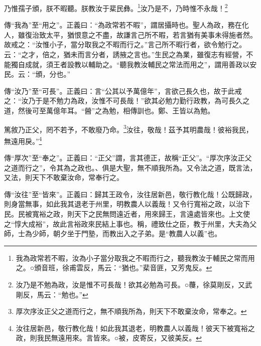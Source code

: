 乃惟孺子頒，朕不暇聽。朕教汝于棐民彝。\footnote{我為政常若不暇，汝為小子當分取我之不暇而行之，聽我教汝于輔民之常而用之。○頒音班，徐甫雲反，馬云：“猶也。”棐音匪，又芳鬼反。}汝乃是不，乃時惟不永哉！\footnote{汝乃是不勉為政，汝是惟不可長哉！欲其必勉為可長。○蘉，徐莫剛反，又武剛反，馬云：“勉也。”}

{\noindent\zhuan{}\fzbyks 傳“我為”至“用之”。正義曰：“為政常若不暇”，謂居攝時也。聖人為政，務在化人，雖復治致太平，猶恨意之不盡，故謙言己所不暇，若言猶有美事未得施者然。故戒之：“汝惟小子，當分取我之不暇而行之。”言己所不暇行者，欲令勉行之。云：“之才，倍之，猶未而言分者，誘掖之言也。”生民之為業，雖復志有經營，不能獨自成就，須王者設教以輔助之。“聽我教汝輔民之常法而用之”，謂用善政以安民。云：“頒，分也。” \par}

{\noindent\zhuan{}\fzbyks 傳“汝乃”至“可長”。正義曰：言“公其以予萬億年”，言欲己長久也，故于此戒之：“汝乃于是不勉力為政，汝惟不可長哉！”欲其必勉力勤行政教，為可長久之道，然後可至萬億年耳。“醟”之為勉，相傳訓也。鄭、王皆以為勉。 \par}

篤敘乃正父，罔不若予，不敢廢乃命。\footnote{厚次序汝正父之道而行之，無不順我所為，則天下不敢棄汝命，常奉之。}汝往，敬哉！茲予其明農哉！彼裕我民，無遠用戾。”\footnote{汝往居新邑，敬行教化哉！如此我其退老，明教農人以義哉！彼天下被寬裕之政，則我民無遠用來。言皆來。○被，皮寄反，又彼美反。}

{\noindent\zhuan{}\fzbyks 傳“厚次”至“奉之”。正義曰：“正父”謂，言其德正，故稱“正父”。“厚次序汝正父之道而行之”，令其為之政也。、俱是大聖，無不順我所為。又令法之道，既言法，又法，則天下不敢棄汝命，常奉行之。 \par}

{\noindent\zhuan{}\fzbyks 傳“汝往”至“皆來”。正義曰：歸其王政令，汝往居新邑，敬行教化哉！公既歸政，則身當無事，如此我其退老于州里，明教農人以義哉！又令行寬裕之政，以治下民。民被寬裕之政，則天下之民無問遠近者，用來歸王，言遠處皆來也。上文使之“惇大成裕”，故此言裕政來民結上事也。稱，禮致仕之臣，教于州里，大夫為父師，士為少師，朝夕坐于門塾，而教出入之子弟。是“教農人以義”也。 \par}

